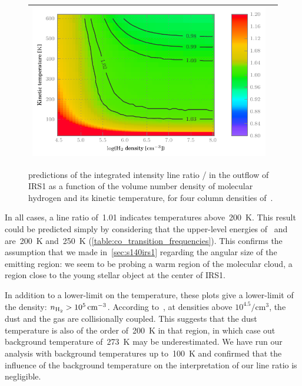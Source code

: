 \begin{figure}
\begin{tabular}{cc}
\begin{minipage}{9.5cm}
            \includegraphics[width=\linewidth]{radex_grid_outf_n190_t00273}
        \end{minipage}
        \\
        \bottomrule
    \end{tabular}%
    \caption{\Radex{} predictions of the integrated intensity line ratio / in the outflow of IRS1 as a function of the volume number density of molecular hydrogen and its kinetic temperature, for four column densities of~.}
    \label{fig:radex_outf}
\end{figure}

In all cases, a line ratio of~\num{1.01} indicates temperatures above~\SI{200}{\kelvin}.
This result could be predicted simply by considering that the upper-level energies
of~ and  are~\SI{200}{\kelvin} and~\SI{250}{\kelvin} (\cref{table:co_transition_frequencies}).
This confirms the assumption that we made in~\cref{sec:s140irs1} regarding the angular size of the emitting region: 
we seem to be probing a warm region of the molecular cloud, a region close to the young stellar object at the center of IRS1.

In addition to a lower-limit on the temperature, these plots give a lower-limit of the density: $n_\text{\ce{H2}} > \SI{e5}{\per\centi\meter\cubed}$.
According to~\textcite{goldsmith2001}, at densities above $10^{4.5} \si{\per\centi\meter\cubed}$, the dust and the gas are collisionally coupled.
This suggests that the dust temperature is also of the order of~\SI{200}{\kelvin} in that region, in which case out background temperature of~\SI{273}{\kelvin} may be underestimated.
We have run our \radex{} analysis with background temperatures up to~\SI{100}{\kelvin} and confirmed that the influence of the background temperature on the interpretation of our line ratio is negligible.

